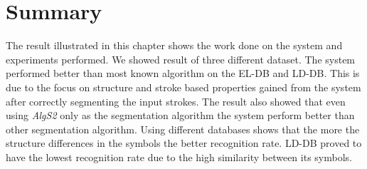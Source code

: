 \section{Summary}
\label{sec:ResultSummary}

The result illustrated in this chapter shows the work done on the system and experiments performed. We showed result of three different dataset. The system performed better than most known algorithm on the EL-DB and LD-DB. This is due to the focus on structure and stroke based properties gained from the system after correctly segmenting the input strokes. The result also showed that even using \textsl{AlgS2} only as the segmentation algorithm the system perform better than other segmentation algorithm. Using different databases shows that the more the structure differences in the symbols the better recognition rate. LD-DB proved to have the lowest recognition rate due to the high similarity between its symbols.    %


